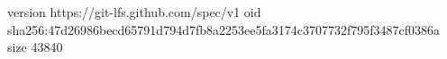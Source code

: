 version https://git-lfs.github.com/spec/v1
oid sha256:47d26986becd65791d794d7fb8a2253ee5fa3174c3707732f795f3487cf0386a
size 43840
